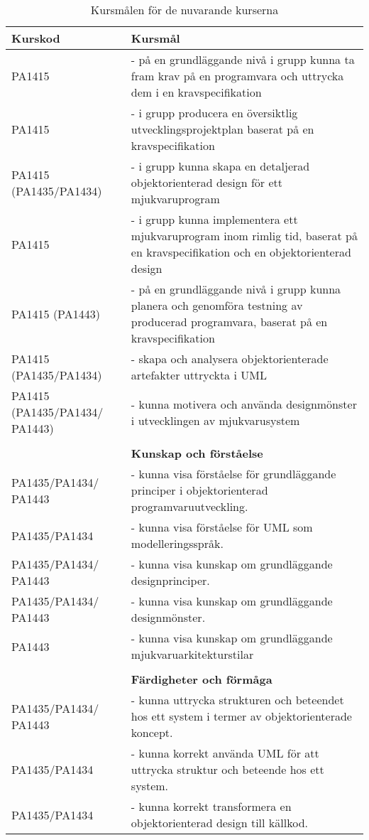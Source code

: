 \documentclass[10pt,t,a4paper]{article}
\begin{document}
\begin{table}[!t]
\caption{\label{tab:orgtable2}
Kursmålen för de nuvarande kurserna}
\centering
\begin{tabular}{p{3cm}p{12cm}}
Kurskod & Kursmål\\
\hline
PA1415 & - på en grundläggande nivå i grupp kunna ta fram krav på en programvara och uttrycka dem i en kravspecifikation\\
PA1415 & - i grupp producera en översiktlig utvecklingsprojektplan baserat på en kravspecifikation\\
PA1415 (PA1435/PA1434) & - i grupp kunna skapa en detaljerad objektorienterad design för ett mjukvaruprogram\\
PA1415 & - i grupp kunna implementera ett mjukvaruprogram inom rimlig tid, baserat på en kravspecifikation och en objektorienterad design\\
PA1415 (PA1443) & - på en grundläggande nivå i grupp kunna planera och genomföra testning av producerad programvara, baserat på en kravspecifikation\\
PA1415 (PA1435/PA1434) & - skapa och analysera objektorienterade artefakter uttryckta i UML\\
PA1415 (PA1435/PA1434/ PA1443) & - kunna motivera och använda designmönster i utvecklingen av mjukvarusystem\\
 & \\
 & \textbf{Kunskap och förståelse}\\
PA1435/PA1434/ PA1443 & - kunna visa förståelse för grundläggande principer i objektorienterad programvaruutveckling.\\
PA1435/PA1434 & - kunna visa förståelse för UML som modelleringsspråk.\\
PA1435/PA1434/ PA1443 & - kunna visa kunskap om grundläggande designprinciper.\\
PA1435/PA1434/ PA1443 & - kunna visa kunskap om grundläggande designmönster.\\
PA1443 & - kunna visa kunskap om grundläggande mjukvaruarkitekturstilar\\
 & \\
 & \textbf{Färdigheter och förmåga}\\
PA1435/PA1434/ PA1443 & - kunna uttrycka strukturen och beteendet hos ett system i termer av objektorienterade koncept.\\
PA1435/PA1434 & - kunna korrekt använda UML för att uttrycka struktur och beteende hos ett system.\\
PA1435/PA1434 & - kunna korrekt transformera en objektorienterad design till källkod.\\

\end{tabular}
\end{table}
\end{document}
